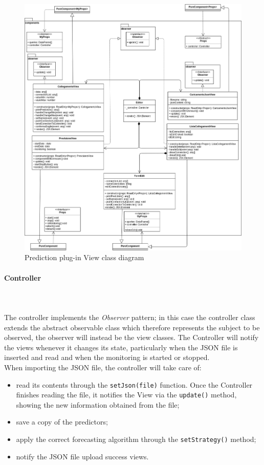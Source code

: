 \begin{figure}[H]
\centering
\includegraphics[scale=0.40]{../../../Diagrams/Classes_diagrams/plugin_view.png}
\caption{Prediction plug-in View class diagram}
\end{figure}

\paragraph{Controller}\mbox{} \\ \mbox{} \\
The controller implements the \textit{Observer} pattern; in this case the controller class extends the abstract observable class which therefore represents the subject to be observed, the observer will instead be the view classes.
The Controller will notify the views whenever it changes its state, particularly when the JSON file is inserted and read and when the monitoring is started or stopped.\\
When importing the JSON file, the controller will take care of: \begin{itemize}
\item read its contents through the \texttt{setJson(file)} function. Once the Controller finishes reading the file, it notifies the View via the \texttt{update()} method, showing the new information obtained from the file;
\item save a copy of the predictors;
\item apply the correct forecasting algorithm through the \texttt{setStrategy()} method;
\item notify the JSON file upload success views.
\end{itemize}

